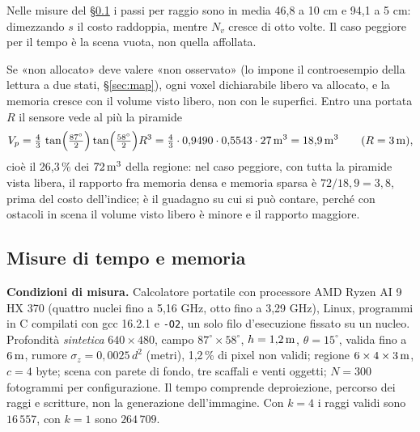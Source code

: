 Nelle misure del \S\ref{sec:cos-misure} i passi per raggio sono in media 46,8 a 10 cm e 94,1 a 5 cm: dimezzando $s$ il costo raddoppia, mentre $N_v$ cresce di otto volte. Il caso peggiore per il tempo è la scena vuota, non quella affollata.

\begin{lemma}\label{lem:cos-sparsa}
Se «non allocato» deve valere «non osservato» (lo impone il controesempio della lettura a due stati, \S\ref{sec:map}), ogni voxel dichiarabile libero va allocato, e la memoria cresce con il volume visto libero, non con le superfici. Entro una portata $R$ il sensore vede al più la piramide
\begin{equation}\label{eq:cos-piramide}
V_p=\tfrac43\,\tan\!\Big(\tfrac{87^\circ}{2}\Big)\tan\!\Big(\tfrac{58^\circ}{2}\Big)R^3=\tfrac43\cdot0{,}9490\cdot0{,}5543\cdot27\,\mathrm{m^3}=18{,}9\,\mathrm{m^3}\qquad(R=3\,\mathrm{m}),
\end{equation}
cioè il 26,3\,\% dei $72\,\mathrm{m^3}$ della regione: nel caso peggiore, con tutta la piramide vista libera, il rapporto fra memoria densa e memoria sparsa è $72/18{,}9=3{,}8$, prima del costo dell'indice; è il guadagno su cui si può contare, perché con ostacoli in scena il volume visto libero è minore e il rapporto maggiore. 
\end{lemma}

\subsection{Misure di tempo e memoria}\label{sec:cos-misure}

\textbf{Condizioni di misura.} Calcolatore portatile con processore AMD Ryzen AI 9 HX 370 (quattro nuclei fino a 5,16 GHz, otto fino a 3,29 GHz), Linux, programmi in C compilati con gcc 16.2.1 e \texttt{-O2}, un solo filo d'esecuzione fissato su un nucleo. Profondità \emph{sintetica} $640\times480$, campo $87^\circ\times58^\circ$, $h=1{,}2\,\mathrm{m}$, $\theta=15^\circ$, valida fino a $6\,\mathrm{m}$, rumore $\sigma_z=0{,}0025\,d^2$ (metri), 1,2\,\% di pixel non validi; regione $6\times4\times3\,\mathrm{m}$, $c=4$ byte; scena con parete di fondo, tre scaffali e venti oggetti; $N=300$ fotogrammi per configurazione. Il tempo comprende deproiezione, percorso dei raggi e scritture, non la generazione dell'immagine. Con $k=4$ i raggi validi sono $16\,557$, con $k=1$ sono $264\,709$.

